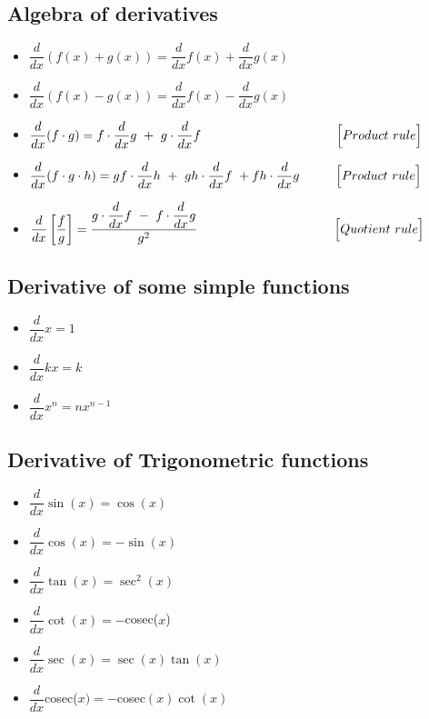 \documentclass{article}
\begin{document}
\subsection{Algebra of derivatives}
\begin{itemize}
  \item $\dfrac{d}{dx}(f(x) + g(x)) = \dfrac{d}{dx}f(x) + \dfrac{d}{dx}g(x)$
  \item $\dfrac{d}{dx}(f(x) - g(x)) = \dfrac{d}{dx}f(x) - \dfrac{d}{dx}g(x)$
  \item $\dfrac{d}{dx}(f\cdot g) = f\cdot\dfrac{d}{dx}g\ +\ g\cdot\dfrac{d}{dx}f {\hspace{3.75cm}\Bigl[Product\ rule\Bigr]}$
  \item $\dfrac{d}{dx}(f\cdot g\cdot h) = gf\cdot\dfrac{d}{dx}h\ +\ gh\cdot\dfrac{d}{dx}f\ +fh\cdot\dfrac{d}{dx}g {\hspace{1cm}\Bigl[Product\ rule\Bigr]}$
  \item $\dfrac{d}{dx}\left[\dfrac{f}{g}\right] = \dfrac{g\cdot\dfrac{d}{dx}f\ -\ f\cdot\dfrac{d}{dx}g}{{g}^2} {\hspace{3.8cm}\Bigl[Quotient\ rule\Bigr]}$
  
\end{itemize}


\subsection{Derivative of some simple functions}
\begin{itemize}
  \item $\dfrac{d}{dx}x = 1$
  \item $\dfrac{d}{dx}kx = k$
  \item $\dfrac{d}{dx}x^n = nx^{n-1}$
\end{itemize}

\subsection{Derivative of Trigonometric functions}
\begin{itemize}
  \item $\dfrac{d}{dx}\sin(x) = \cos(x)$
  \item $\dfrac{d}{dx}\cos(x) = -\sin(x)$
  \item $\dfrac{d}{dx}\tan(x) = \sec^2(x)$
  \item $\dfrac{d}{dx}\cot(x) = -$cosec($x$)
  \item $\dfrac{d}{dx}\sec(x) = \sec(x)\tan(x)$
  \item $\dfrac{d}{dx}$cosec($x) = -$cosec$(x)\cot(x)$
\end{itemize}
\end{document}
